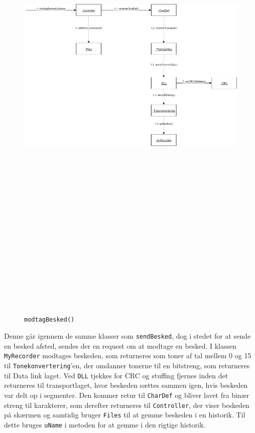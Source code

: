 \begin{figure}[ht]
	\centering
	\includegraphics[width=15cm,height=25cm,keepaspectratio]{pictures/SDmodtagBesked.png}
	\caption{\texttt{modtagBesked()}}
	\label{fig:modtagb}
\end{figure}
\hfill \break
Denne går igennem de samme klasser som \texttt{sendBesked}, dog i stedet for at sende en besked afsted, sendes der en request om at modtage en besked. I klassen \texttt{MyRecorder} modtages beskeden, som returneres som toner af tal mellem 0 og 15 til \texttt{Tonekonvertering}'en, der omdanner tonerne til en bitstreng, som returneres til Data link laget. Ved \texttt{DLL} tjekkes for CRC og stuffing fjernes inden det returneres til transportlaget, hvor beskeden sættes sammen igen, hvis beskeden var delt op i segmenter. Den kommer retur til \texttt{CharDef} og bliver lavet fra binær streng til karakterer, som derefter returneres til \texttt{Controller}, der viser beskeden på skærmen og samtidig bruger \texttt{Files} til at gemme beskeden i en historik. Til dette bruges \texttt{uName} i metoden for at gemme i den rigtige historik.
